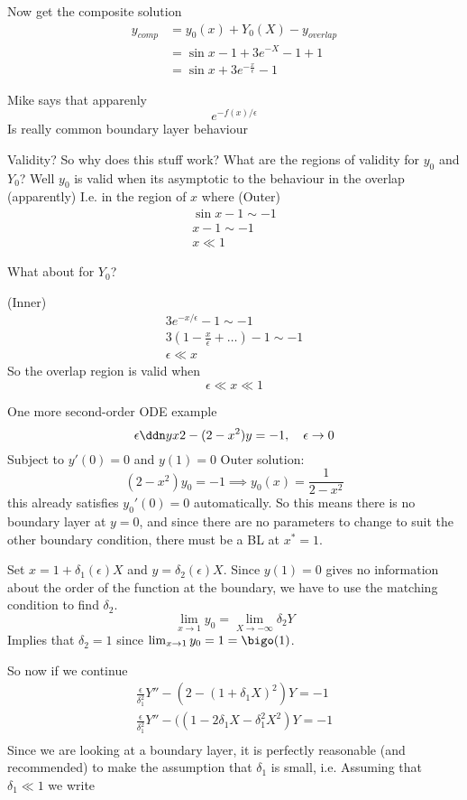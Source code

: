 \documentclass{X:/Documents/Coding/Latex/myassignment}
\begin{document}
Now get the composite solution
\begin{align*}
    y_{comp} &= y_0(x) + Y_0(X) - y_{overlap}\\
    &= \sin x - 1 + 3e^{-X} -1 + 1\\
    &= \sin x + 3e^{-\frac x\epsilon}-1 
\end{align*}

Mike says that apparenly
\[e^{-f(x)/\epsilon}\]
Is really common boundary layer behaviour


Validity?
So why does this stuff work? What are the regions of validity for $y_0$ and $Y_0$?
Well $y_0$ is valid when its asymptotic to the behaviour in the overlap (apparently)
I.e. in the region of $x$ where
(Outer)
\begin{align*}
    \sin x -1 \sim -1\\
    x -1 \sim -1\\
    x \ll 1
\end{align*}

What about for $Y_0$?

(Inner)
\begin{align*}
    3e^{-x/\epsilon} -1 \sim -1\\
    3(1 - \frac{x}{\epsilon} + \ldots) -1 \sim -1\\
    \epsilon \ll x
\end{align*}
So the overlap region is valid when
\[\epsilon \ll x \ll 1 \]


One more second-order ODE example
\[\epsilon \ddn yx2 - (2-x^2) y = -1, \quad \epsilon \to 0\]
Subject to $y'(0) =0$ and $y(1) = 0$
Outer solution:
\[(2-x^2) y_0 = -1 \implies y_0(x) = \frac{1}{2-x^2}\]
this already satisfies $y_0'(0) =0$ automatically. So this means there is no boundary layer at $y=0$, and since there are no parameters to change to suit the other boundary condition, there must be a BL at $x^* =1$.

Set $x = 1+ \delta_1(\epsilon) X$ and $y = \delta_2(\epsilon) X$. Since $y(1) = 0$ gives no information about the order of the function at the boundary, we have to use the matching condition to find $\delta_2$.
\[\lim_{x\to 1} y_0 = \lim_{X\to -\infty} \delta_2 Y\]
Implies that $\delta_2 =1$ since $\lim_{x\to 1} y_0 = 1 = \bigo(1)$.

So now if we continue
\begin{align*}
    \frac{\epsilon}{\delta_1^2} Y'' - (2-(1+\delta_1 X)^2)Y=-1\\
    \frac{\epsilon}{\delta_1^2} Y'' - ((1- 2\delta_1 X - \delta_1^2 X^2)Y=-1\\
\end{align*}
Since we are looking at a boundary layer, it is perfectly reasonable (and recommended) to make the assumption that $\delta_1$ is small, i.e. Assuming that $\delta_1 \ll 1$ we write
\end{document}
